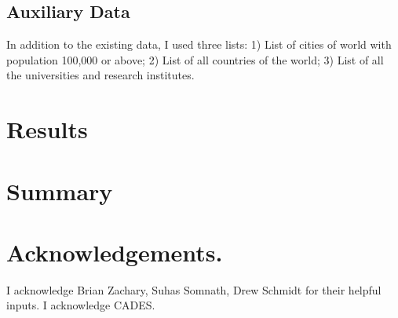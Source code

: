 \documentclass{report}
\begin{document}
\subsection*{Auxiliary Data}
In addition to the existing data, I used three lists: 1) List of cities of
world with population 100,000 or above; 2) List of all countries of the world;
3) List of all the universities and research institutes.

\section*{Results}
\section*{Summary}

\section*{Acknowledgements.}
I acknowledge Brian Zachary, Suhas Somnath, Drew Schmidt for their helpful
inputs. I acknowledge CADES.
\end{document}
